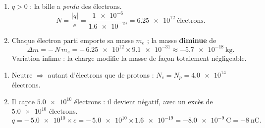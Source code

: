 \documentclass[11pt,a4paper]{article}
\begin{document}
\begin{corrige}
\begin{enumerate}[label=\alph*)]
  \item $q>0$ : la bille a \emph{perdu} des électrons.
        \[ N = \frac{|q|}{e} = \frac{\num{1e-6}}{\num{1.6e-19}} = \num{6.25e12}\ \text{électrons}. \]
  \item Chaque électron parti emporte sa masse $m_e$ ; la masse \textbf{diminue} de
        \[ \Delta m = -\,N\,m_e = -\,\num{6.25e12}\times\num{9.1e-31} \approx \SI{-5.7e-18}{\kilogram}. \]
        Variation infime : la charge modifie la masse de façon totalement négligeable.
\end{enumerate}
\end{corrige}

\begin{corrige}
\begin{enumerate}[label=\alph*)]
  \item Neutre $\Rightarrow$ autant d'électrons que de protons : $N_e = N_p = \num{4.0e14}$ électrons.
  \item Il capte $\num{5.0e10}$ électrons : il devient négatif, avec un excès de $\num{5.0e10}$
        électrons.
        \[ q = -\,\num{5.0e10}\times e = -\,\num{5.0e10}\times\num{1.6e-19} = \SI{-8.0e-9}{\coulomb} = \SI{-8}{\nano\coulomb}. \]
\end{enumerate}
\end{corrige}
\end{document}
